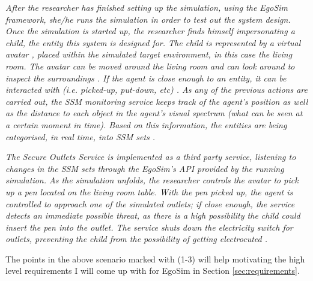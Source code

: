 \begin{flushright}{\slshape
After the researcher has finished setting up the simulation, using the EgoSim framework, she/he runs the simulation in order to test out the system design. Once the simulation is started up, the researcher finds himself impersonating a child, the entity this system is designed for. The child is represented by a virtual avatar , placed within the simulated target environment, in this case the living room. The avatar can be moved around the living room  and can look around to inspect the surroundings . If the agent is close enough to an entity, it can be interacted with (i.e. picked-up, put-down, etc) . As any of the previous actions are carried out, the SSM monitoring service  keeps track of the agent's position as well as the distance to each object in the agent's visual spectrum (what can be seen at a certain moment in time). Based on this information, the entities are being categorised, in real time, into SSM sets .
} \\ \medskip
\end{flushright}

\begin{flushright}{\slshape
The Secure Outlets Service is implemented as a third party service, listening to changes in the SSM sets through the EgoSim's API provided by the running simulation. As the simulation unfolds, the researcher controls the avatar to pick up a pen located on the living room table. With the pen picked up, the agent is controlled to approach one of the simulated outlets; if close enough, the service detects an immediate possible threat, as there is a high possibility the child could insert the pen into the outlet. The service shuts down the electricity switch for outlets, preventing the child from the possibility of getting electrocuted .
} \\ \medskip
\end{flushright}

The points in the above scenario marked with (1-3) will help motivating the high level requirements I will come up with for EgoSim in Section \ref{sec:requirements}.
